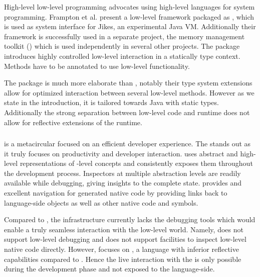 High-level low-level programming \cite{Fram09a} advocates using high-level languages for system programming.
Frampton et al. present a low-level framework packaged as , which is used as system interface for Jikes, an experimental Java VM.
Additionally their framework is successfully used in a separate project, the memory management toolkit (\MMTK) \cite{Blac04a} which is used independently in several other projects.
The  package introduces highly controlled low-level interaction in a statically type context.
Methods have to be annotated to use low-level functionality. 

The  package is much more elaborate than \NB, notably their type system extensions allow for optimized interaction between several low-level methods.
However as we state in the introduction, it is tailored towards Java with static types.
Additionally the strong separation between low-level code and runtime does not allow for reflective extensions of the runtime.

\subsubsection*{\Maxine \Java \VM}
\Maxine is a metacircular \Java \VM \cite{Wimm13a} focused on an efficient developer experience.
The \Maxine \VM stands out as it truly focuses on productivity and developer interaction.
\Maxine uses abstract and high-level representations of \VM-level concepts and consistently exposes them throughout the development process.
Inspectors at multiple abstraction levels are readily available while debugging, giving insights to the complete \VM state.
\Maxine provides and excellent navigation for generated native code by providing links back to language-side objects as well as other native code and symbols.

Compared to \Maxine, the \B infrastructure currently lacks the debugging tools which would enable a truly seamless interaction with the low-level world.
Namely, \B does not support low-level debugging and does not support facilities to inspect low-level native code directly.
However, \Maxine focuses on \Java, a language with inferior reflective capabilities compared to \PH.
Hence the live interaction with the \VM is only possible during the development phase and not exposed to the language-side.


